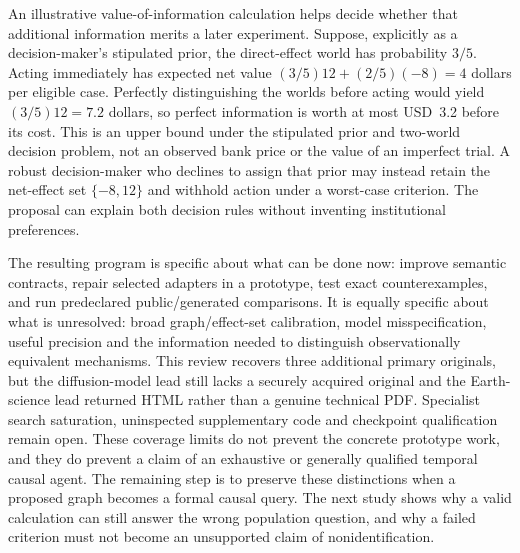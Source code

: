 An illustrative value-of-information calculation helps decide whether that
additional information merits a later experiment. Suppose, explicitly as a
decision-maker's stipulated prior, the direct-effect world has probability
$3/5$. Acting immediately has expected net value
$(3/5)12+(2/5)(-8)=4$ dollars per eligible case. Perfectly distinguishing the
worlds before acting would yield $(3/5)12=7.2$ dollars, so perfect information
is worth at most USD~3.2 before its cost. This is an upper bound under the
stipulated prior and two-world decision problem, not an observed bank price
or the value of an imperfect trial. A robust decision-maker who declines to
assign that prior may instead retain the net-effect set $\{-8,12\}$ and
withhold action under a worst-case criterion. The proposal can explain both
decision rules without inventing institutional preferences.
\citep{exec15_latent_exact}

The resulting program is specific about what can be done now: improve
semantic contracts, repair selected adapters in a prototype, test exact
counterexamples, and run predeclared public/generated comparisons. It is
equally specific about what is unresolved: broad graph/effect-set
calibration, model misspecification, useful precision and the information
needed to distinguish observationally equivalent mechanisms. This review
recovers three additional primary originals, but the diffusion-model lead
still lacks a securely acquired original and the Earth-science lead returned
HTML rather than a genuine technical PDF. Specialist search saturation,
uninspected supplementary code and checkpoint qualification remain open.
These coverage limits do not prevent the concrete prototype work, and they
do prevent a claim of an exhaustive or generally qualified temporal causal
agent.
\citep{exec15_latent_design}
The remaining step is to preserve these distinctions when a proposed graph
becomes a formal causal query. The next study shows why a valid calculation
can still answer the wrong population question, and why a failed criterion
must not become an unsupported claim of nonidentification.
\label{exec15:latent-temporal-end}

